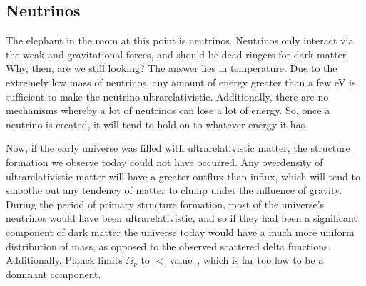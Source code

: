 \subsection{Neutrinos}

The elephant in the room at this point is neutrinos. Neutrinos only interact via the weak and gravitational forces, and should be dead ringers for dark matter. Why, then, are we still looking? The answer lies in temperature. Due to the extremely low mass of neutrinos, any amount of energy greater than a few eV is sufficient to make the neutrino ultrarelativistic. Additionally, there are no mechanisms whereby a lot of neutrinos can lose a lot of energy. So, once a neutrino is created, it will tend to hold on to whatever energy it has.

Now, if the early universe was filled with ultrarelativistic matter, the structure formation we observe today could not have occurred. Any overdensity of ultrarelativistic matter will have a greater outflux than influx, which will tend to smoothe out any tendency of matter to clump under the influence of gravity. During the period of primary structure formation, most of the universe's neutrinos would have been ultrarelativistic, and so if they had been a significant component of dark matter the universe today would have a much more uniform distribution of mass, as opposed to the observed scattered delta functions. Additionally, Planck limits $\Omega_\nu$ to $<$ value~\cite{}, which is far too low to be a dominant component.

%